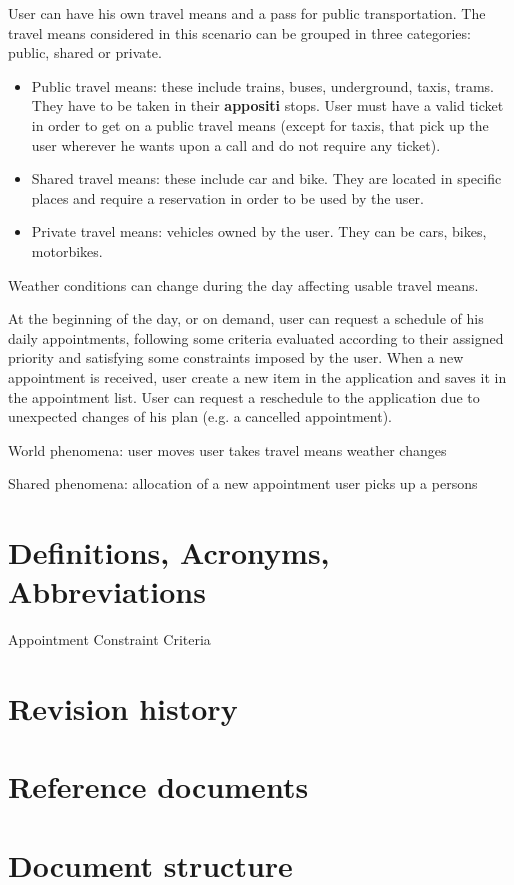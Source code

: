 User can have his own travel means and a pass for public transportation. 
The travel means considered in this scenario can be grouped in three categories: public, shared or private.
\begin{itemize}
\item Public travel means: these include trains, buses, underground, taxis, trams. They have to be taken in their \textbf{appositi} stops. User must have a valid ticket in order to get on a public travel means (except for taxis, that pick up the user wherever he wants upon a call and do not require any ticket). 
\item Shared travel means: these include car and bike. They are located in specific places and require a reservation in order to be used by the user.
\item Private travel means: vehicles owned by the user. They can be cars, bikes, motorbikes.
\end{itemize}

Weather conditions can change during the day affecting usable travel means.

At the beginning of the day, or on demand, user can request a schedule of his daily appointments, following some criteria evaluated according to their assigned priority and satisfying some constraints imposed by the user.
When a new appointment is received, user create a new item in the application and saves it in the appointment list. User can request a reschedule to the application due to unexpected changes of his plan (e.g. a cancelled appointment).


World phenomena:
user moves
user takes travel means
weather changes

Shared phenomena:
allocation of a new appointment
user picks up a persons

\section{Definitions, Acronyms, Abbreviations}

Appointment
Constraint
Criteria

\section{Revision history}

\section{Reference documents}

\section{Document structure}